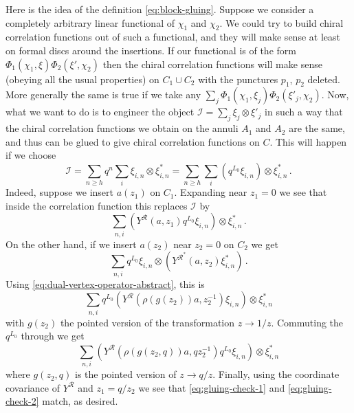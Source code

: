 \documentclass[12pt,letterpaper,reqno]{amsart}
\numberwithin{equation}{section}
\newcommand{\cI}{\ensuremath{\mathcal I}}
\newcommand{\vrep}{\mathcal{R}}
\begin{document}
Here is the idea of the definition \eqref{eq:block-gluing}. 
Suppose we consider a completely arbitrary linear functional of $\chi_1$
and $\chi_2$. We could try to build chiral correlation functions out of such a functional, and they will make
sense at least on formal discs around the insertions. 
If our functional is of the form $\Phi_1(\chi_1, \xi) \Phi_2(\xi', \chi_2)$ then the chiral
correlation functions will make sense (obeying all the usual properties) 
on $C_1 \cup C_2$ with the punctures $p_1$, $p_2$ deleted.
More generally the same is true if we take any $\sum_j \Phi_1(\chi_1, \xi_j) \Phi_2(\xi'_j, \chi_2)$.
Now, what we want to do is to engineer the object $\cI = \sum_j \xi_j \otimes \xi'_j$
in such a way that the chiral correlation
functions we obtain on the annuli $A_1$ and $A_2$ are the same, and thus can be glued to give chiral
correlation functions on $C$. 
This will happen if we choose
\begin{equation}
  \cI = \sum_{n \ge h} q^{n} \sum_i \xi_{i,n} \otimes \xi^*_{i,n} = \sum_{n \ge h} \sum_i (q^{L_0} \xi_{i,n}) \otimes \xi^*_{i,n} \, .
\end{equation}
Indeed, suppose we insert $a(z_1)$ on $C_1$.
Expanding near $z_1 = 0$ we see that inside the correlation function this replaces $\cI$ by
\begin{equation} \label{eq:gluing-check-1}
 \sum_{n,i} (Y^\vrep (a, z_1) q^{L_0} \xi_{i,n}) \otimes \xi^*_{i,n} \, .
\end{equation}
On the other hand, if we insert $a(z_2)$ near $z_2 = 0$ on $C_2$ we get
\begin{equation}
 \sum_{n,i} q^{L_0} \xi_{i,n} \otimes (Y^{\vrep^*} (a, z_2) \xi^*_{i,n}) \, .
\end{equation}
Using \eqref{eq:dual-vertex-operator-abstract}, this is
\begin{equation}
\sum_{n,i} q^{L_0} (Y^{\vrep}(\rho(g(z_2)) a, z_2^{-1}) \xi_{i,n}) \otimes \xi^*_{i,n}
\end{equation}
with $g(z_2)$ the pointed version of the transformation $z \to 1/z$.
Commuting the $q^{L_0}$ through we get
\begin{equation} \label{eq:gluing-check-2}
\sum_{n,i} (Y^{\vrep}(\rho(g(z_2,q)) a, q z_2^{-1}) q^{L_0} \xi_{i,n}) \otimes \xi^*_{i,n}
\end{equation}
where $g(z_2,q)$ is the pointed version of $z \to q/z$.
Finally, using the coordinate covariance of $Y^\vrep$ and $z_1 = q / z_2$ we see that
\eqref{eq:gluing-check-1} and \eqref{eq:gluing-check-2} match, as desired.
\end{document}
